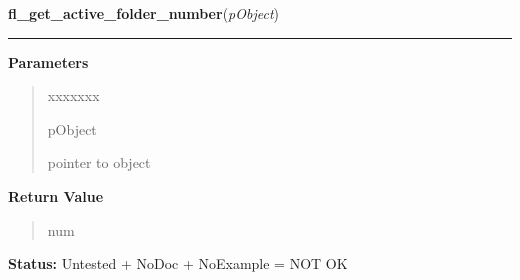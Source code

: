 \hspace{.8\funcindent}\begin{boxedminipage}{\funcwidth}

    \raggedright \textbf{fl\_get\_active\_folder\_number}(\textit{pObject})

    \vspace{-1.5ex}

    \rule{\textwidth}{0.5\fboxrule}
\setlength{\parskip}{2ex}
\setlength{\parskip}{1ex}
      \textbf{Parameters}
      \vspace{-1ex}

      \begin{quote}
        \begin{Ventry}{xxxxxxx}

          \item[pObject]

          pointer to object

        \end{Ventry}

      \end{quote}

      \textbf{Return Value}
    \vspace{-1ex}

      \begin{quote}
      num

      \end{quote}

\textbf{Status:} Untested + NoDoc + NoExample = NOT OK



    \end{boxedminipage}

    \label{xformslib:library:fl_get_active_folder_name}

    \vspace{0.5ex}

